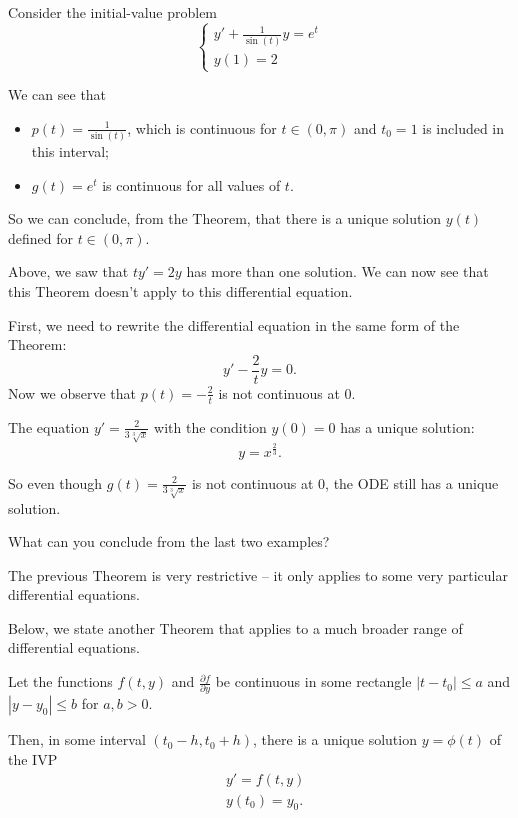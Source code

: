\begin{example}
Consider the initial-value problem
$$
\begin{cases}
y'+\frac{1}{\sin(t)}y = e^t \\
y(1)=2
\end{cases}
$$

We can see that 
\begin{itemize}
	\item $p(t) = \frac{1}{\sin(t)}$, which is continuous for $t \in (0,\pi)$ and $t_0=1$ is included in this interval;
	\item $g(t) = e^t$ is continuous for all values of $t$.
\end{itemize}

So we can conclude, from the Theorem, that there is a unique solution $y(t)$ defined for $t \in (0,\pi)$.
\end{example}


\begin{example}
Above, we saw that $ty'=2y$ has more than one solution. 
We can now see that this Theorem doesn't apply to this differential equation.

First, we need to rewrite the differential equation in the same form of the Theorem:
$$
y' -\frac2t y = 0.
$$
Now we observe that $p(t) = -\frac2t$ is not continuous at $0$.
\end{example}


\begin{example} The equation $y'=\frac{2}{3\sqrt[3]{x}}$ with the condition $y(0) = 0$ has a unique solution:
$$
y = x^{\frac23}.
$$

So even though $g(t) = \frac{2}{3\sqrt[3]{x}}$ is not continuous at $0$, the ODE still has a unique solution.
\end{example}



\begin{graybox}
	What can you conclude from the last two examples?
\end{graybox}


The previous Theorem is very restrictive -- it only applies to some very particular differential equations. 

Below, we state another Theorem that applies to a much broader range of differential equations.

\begin{theorem}
Let the functions $f(t,y)$ and $\frac{\partial f}{\partial y}$ be continuous in some rectangle $|t-t_0|\leq a$ and $|y-y_0|\leq b$ for $a,b>0$.

Then, in some interval $(t_0-h,t_0+h)$, there is a unique solution $y=\phi(t)$ of the IVP
\begin{align*}
& y' = f(t,y) \\
& y(t_0) = y_0.
\end{align*}

\end{theorem}

